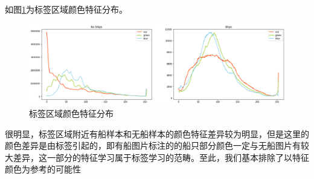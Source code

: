 如图\ref{fig::EDA11}为标签区域颜色特征分布。

\begin{figure}[htbp]
\centering
\includegraphics[width=1\linewidth]{body/EDA_pic/EDA_26_0}
\caption{标签区域颜色特征分布}
\label{fig::EDA11}
\end{figure}

很明显，标签区域附近有船样本和无船样本的颜色特征差异较为明显，但是这里的颜色差异是由标签引起的，即有船图片标注的的船只部分颜色一定与无船图片有较大差异，这一部分的特征学习属于标签学习的范畴。至此，我们基本排除了以特征颜色为参考的可能性
